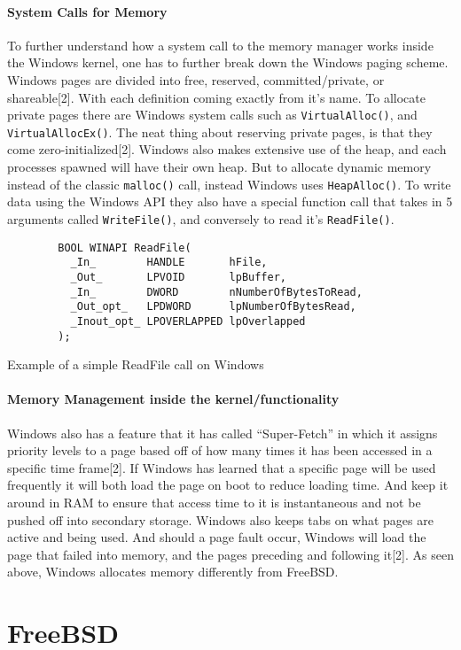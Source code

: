 \documentclass{article}
\begin{document}
\subsection{System Calls for Memory}
	To further understand how a system call to the memory manager works inside the Windows kernel, one has to further break down the Windows paging scheme. Windows pages are divided into free, reserved, committed/private, or shareable[2].  With each definition coming exactly from it’s name. To allocate private pages there are Windows system calls such as \texttt{VirtualAlloc()}, and \texttt{VirtualAllocEx()}. The neat thing about reserving private pages, is that they come zero-initialized[2]. Windows also makes extensive use of the heap, and each processes spawned will have their own heap. But to allocate dynamic memory instead of the classic \texttt{malloc()} call, instead Windows uses \texttt{HeapAlloc()}. To write data using the Windows API they also have a special function call that takes in 5 arguments called \texttt{WriteFile()}, and conversely to read it’s \texttt{ReadFile()}.
		\begin{lstlisting}
		BOOL WINAPI ReadFile(
          _In_        HANDLE       hFile,
          _Out_       LPVOID       lpBuffer,
          _In_        DWORD        nNumberOfBytesToRead,
          _Out_opt_   LPDWORD      lpNumberOfBytesRead,
          _Inout_opt_ LPOVERLAPPED lpOverlapped
        );

		\end{lstlisting}
		Example of a simple ReadFile call on Windows


\subsection{Memory Management inside the kernel/functionality}
    Windows also has a feature that it has called “Super-Fetch” in which it assigns priority levels to a page based off of how many times it has been accessed in a specific time frame[2]. If Windows has learned that a specific page will be used frequently it will both load the page on boot to reduce loading time. And keep it around in RAM to ensure that access time to it is instantaneous and not be pushed off into secondary storage. Windows also keeps tabs on what pages are active and being used. And should a page fault occur, Windows will load the page that failed into memory, and the pages preceding and following it[2]. As seen above, Windows allocates memory differently from FreeBSD.


\part{FreeBSD}
\end{document}
